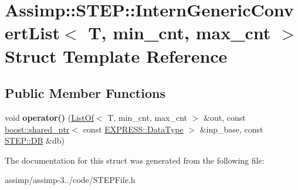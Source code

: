 \hypertarget{struct_assimp_1_1_s_t_e_p_1_1_intern_generic_convert_list}{\section{Assimp\+:\+:S\+T\+E\+P\+:\+:Intern\+Generic\+Convert\+List$<$ T, min\+\_\+cnt, max\+\_\+cnt $>$ Struct Template Reference}
\label{struct_assimp_1_1_s_t_e_p_1_1_intern_generic_convert_list}
}
\subsection*{Public Member Functions}
\begin{DoxyCompactItemize}
\item 
\hypertarget{struct_assimp_1_1_s_t_e_p_1_1_intern_generic_convert_list_a9087789ec6596c2ffb91495c1f281ca2}{void {\bfseries operator()} (\hyperlink{struct_assimp_1_1_s_t_e_p_1_1_list_of}{List\+Of}$<$ T, min\+\_\+cnt, max\+\_\+cnt $>$ \&out, const \hyperlink{classboost_1_1shared__ptr}{boost\+::shared\+\_\+ptr}$<$ const \hyperlink{class_assimp_1_1_s_t_e_p_1_1_e_x_p_r_e_s_s_1_1_data_type}{E\+X\+P\+R\+E\+S\+S\+::\+Data\+Type} $>$ \&inp\+\_\+base, const \hyperlink{class_assimp_1_1_s_t_e_p_1_1_d_b}{S\+T\+E\+P\+::\+D\+B} \&db)}\label{struct_assimp_1_1_s_t_e_p_1_1_intern_generic_convert_list_a9087789ec6596c2ffb91495c1f281ca2}

\end{DoxyCompactItemize}


The documentation for this struct was generated from the following file\+:\begin{DoxyCompactItemize}
\item 
assimp/assimp-\/3../code/S\+T\+E\+P\+File.\+h\end{DoxyCompactItemize}
